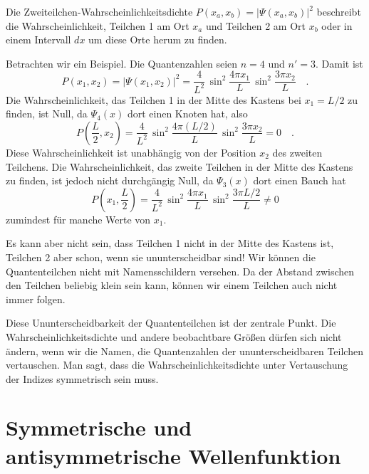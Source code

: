 Die Zweiteilchen-Wahrscheinlichkeitsdichte $P(x_a, x_b) = | \Psi(x_a, x_b)|^2$ beschreibt die Wahrscheinlichkeit, Teilchen 1 am Ort $x_a$ und Teilchen 2 am Ort $x_b$ oder in einem Intervall $dx$ um diese Orte herum zu finden.

Betrachten wir ein Beispiel. Die Quantenzahlen seien $n = 4$ und $n' = 3$. Damit ist 
\begin{equation}
    P(x_1, x_2) = |  \Psi(x_1, x_2)|^2 = \frac{4}{L^2} \, \sin^2 \frac{4 \pi x_1}{L} \, \sin^2 \frac{3 \pi x_2}{L} \quad .
\end{equation}
Die Wahrscheinlichkeit, das Teilchen 1 in der Mitte des Kastens bei $x_1 = L/2$ zu finden, ist Null, da $\Psi_4(x)$ dort einen Knoten hat, also 
\begin{equation}
    P\left(\frac{L}{2}, x_2\right) = \frac{4}{L^2} \, \sin^2 \frac{4 \pi (L/2)}{L} \, \sin^2 \frac{3 \pi x_2}{L}  = 0 \quad .
\end{equation}
Diese Wahrscheinlichkeit ist unabhängig von der Position $x_2$ des zweiten Teilchens. Die Wahrscheinlichkeit, das zweite Teilchen in der Mitte des Kastens zu finden, ist jedoch nicht durchgängig Null, da $\Psi_3(x)$ dort einen Bauch hat
\begin{equation}
    P\left(x_1, \frac{L}{2}\right) = \frac{4}{L^2} \, \sin^2 \frac{4 \pi x_1}{L} \, \sin^2 \frac{3 \pi L/2}{L}  \neq 0
\end{equation}
zumindest für manche Werte von $x_1$.


Es kann aber nicht sein, dass Teilchen 1 nicht in der Mitte des Kastens ist, Teilchen 2 aber schon, wenn sie ununterscheidbar sind! Wir können die Quantenteilchen nicht mit Namensschildern versehen. Da der Abstand zwischen den Teilchen beliebig klein sein kann, können wir einem Teilchen auch nicht immer folgen.

Diese Ununterscheidbarkeit der Quantenteilchen ist der zentrale Punkt. Die Wahrscheinlichkeitsdichte und andere beobachtbare Größen dürfen sich nicht ändern, wenn wir die Namen, die Quantenzahlen der ununterscheidbaren Teilchen vertauschen. Man sagt, dass die Wahrscheinlichkeitsdichte unter Vertauschung der Indizes symmetrisch sein muss.

\section{Symmetrische und antisymmetrische Wellenfunktion}

